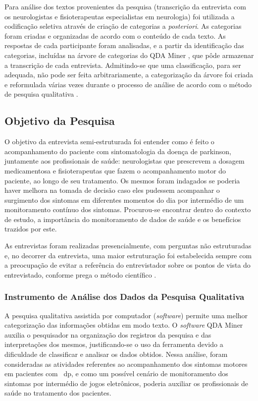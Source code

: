 Para análise dos textos provenientes da pesquisa (transcrição da entrevista com os neurologistas e fisioterapeutas especialistas em neurologia) foi utilizada a codificação seletiva através de criação de categorias a \emph{posteriori}. As categorias foram criadas e organizadas de acordo com o conteúdo de cada texto. As respostas de cada participante foram analisadas, e a partir da identificação das categorias, incluídas na árvore de categorias do QDA Miner \cite{qda13}, que pôde armazenar a transcrição de cada entrevista. Admitindo-se que uma classificação, para ser adequada, não pode ser feita arbitrariamente, a categorização da árvore foi criada e reformulada várias vezes durante o processo de análise de acordo com o método de pesquisa qualitativa \cite{FLI04}.

\subsection{Objetivo da Pesquisa}
O objetivo da entrevista semi-estruturada foi entender como é feito o acompanhamento do paciente com sintomatologia da doença de parkinson, juntamente aos profissionais de saúde: neurologistas que prescrevem a dosagem medicamentosa e fisioterapeutas que fazem o acompanhamento motor do paciente, ao longo de seu tratamento. Os mesmos foram indagados se poderia haver melhora na tomada de decisão caso eles pudessem acompanhar o surgimento dos sintomas em diferentes momentos do dia por intermédio de um monitoramento contínuo dos sintomas. Procurou-se encontrar dentro do contexto de estudo, a importância do monitoramento de dados de saúde e os benefícios trazidos por este.

As entrevistas foram realizadas presencialmente, com perguntas não estruturadas e, no decorrer da entrevista, uma maior estruturação foi estabelecida sempre com a preocupação de evitar a referência do entrevistador sobre os pontos de vista do entrevistado, conforme prega o método científico \cite{FLI04}. 

\subsubsection{Instrumento de Análise dos Dados da Pesquisa Qualitativa} \label{section:analise_dados} 
A pesquisa qualitativa assistida por computador (\textit{software}) permite uma melhor categorização das informações obtidas em modo texto. O \textit{software} QDA Miner \cite{qda13} auxilia o pesquisador na organização dos registros da pesquisa e das interpretações dos mesmos, justificando-se o uso da ferramenta devido a dificuldade de classificar e analisar os dados obtidos. Nessa análise, foram consideradas as atividades referentes ao acompanhamento dos sintomas motores em pacientes com ~\ac{dp}, e como um possível cenário de monitoramento dos sintomas por intermédio de jogos eletrônicos, poderia auxiliar os profissionais de saúde no tratamento dos pacientes.

